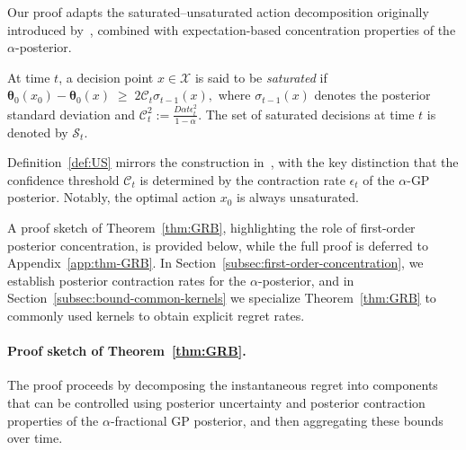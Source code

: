 \documentclass[final,12pt]{colt2026} %
\begin{document}
Our proof adapts the saturated–unsaturated action decomposition originally introduced by~\cite{agrawal2013thompsonLIN}, combined with expectation-based concentration properties of the $\alpha$-posterior.

\begin{definition}\label{def:US}
At time $t$, a decision point $x \in \mathcal{X}$ is said to be \emph{saturated} if
\(
\pmb\theta_0(x_0) - \pmb\theta_0(x)
\;\geq\;
2\mathcal{C}_t \sigma_{t-1}(x),
\)
where $\sigma_{t-1}(x)$ denotes the posterior standard deviation and
\(
\mathcal{C}_t^2 := \frac{D \alpha t \epsilon_t^2}{1-\alpha}.
\)
The set of saturated decisions at time $t$ is denoted by $\mathcal{S}_t$.
\end{definition}

Definition~\ref{def:US} mirrors the construction in~\cite{agrawal2013thompsonLIN}, with the key distinction that the confidence threshold $\mathcal{C}_t$ is determined by the contraction rate $\epsilon_t$ of the $\alpha$-GP posterior. Notably, the optimal action $x_0$ is always unsaturated.

A proof sketch of Theorem~\ref{thm:GRB}, highlighting the role of first-order posterior concentration, is provided below, while the full proof is deferred to Appendix~\ref{app:thm-GRB}. In Section~\ref{subsec:first-order-concentration}, we establish posterior contraction rates for the $\alpha$-posterior, and in Section~\ref{subsec:bound-common-kernels} we specialize Theorem~\ref{thm:GRB} to commonly used kernels to obtain explicit regret rates.

\paragraph{Proof sketch of Theorem~\ref{thm:GRB}.}
The proof proceeds by decomposing the instantaneous regret into components that can be controlled using posterior uncertainty and posterior contraction properties of the $\alpha$-fractional GP posterior, and then aggregating these bounds over time.
\end{document}
